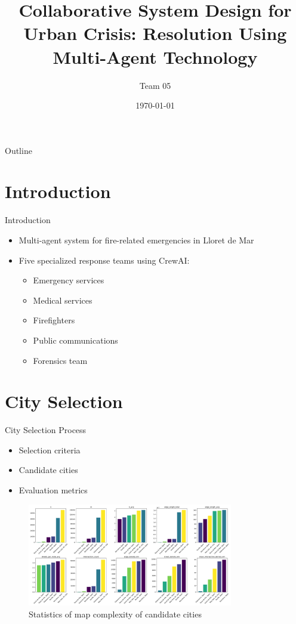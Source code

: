 \documentclass{beamer}
\title{Collaborative System Design for Urban Crisis: Resolution Using Multi-Agent Technology}
\author{Team 05}
\date{\today}
\begin{document}
\begin{frame}
    \titlepage
\end{frame}

\begin{frame}{Outline}
    \tableofcontents
\end{frame}

\section{Introduction}
\begin{frame}{Introduction}
    \begin{itemize}
        \item Multi-agent system for fire-related emergencies in Lloret de Mar
        \item Five specialized response teams using CrewAI:
        \begin{itemize}
            \item Emergency services
            \item Medical services
            \item Firefighters
            \item Public communications
            \item Forensics team
        \end{itemize}
    \end{itemize}
\end{frame}

\section{City Selection}
\begin{frame}{City Selection Process}
    \begin{itemize}
        \item Selection criteria
        \item Candidate cities
        \item Evaluation metrics
    \end{itemize}
    \begin{figure}[H]
        \centering
        \includegraphics[width=0.8\textwidth]{../figures/map_complexity_statistics.png}
        \caption{Statistics of map complexity of candidate cities}
    \end{figure}
\end{frame}
\end{document}
